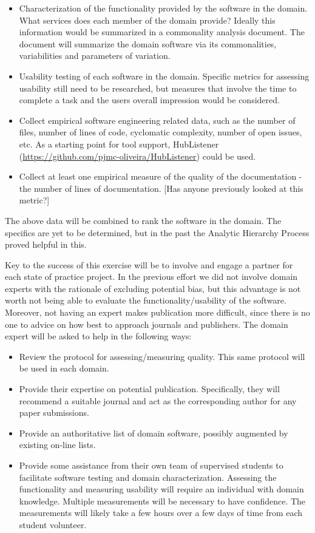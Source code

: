 \documentclass[12pt]{article}
\begin{document}
\begin{itemize}
\item Characterization of the functionality provided by the software in the
  domain.  What services does each member of the domain provide?  Ideally this
  information would be summarized in a commonality analysis document.  The
  document will summarize the domain software via its commonalities,
  variabilities and parameters of variation.
\item Usability testing of each software in the domain.  Specific metrics for
  assessing usability still need to be researched, but measures that involve the
  time to complete a task and the users overall impression would be considered.
\item Collect empirical software engineering related data, such as the number of
  files, number of lines of code, cyclomatic complexity, number of open issues,
  etc.  As a starting point for tool support, HubListener
  (\url{https://github.com/pjmc-oliveira/HubListener}) could be used.
\item Collect at least one empirical measure of the quality of the documentation
  - the number of lines of documentation.  [Has anyone previously looked at this
  metric?]
\end{itemize}

The above data will be combined to rank the software in the domain.  The
specifics are yet to be determined, but in the past the Analytic Hierarchy
Process proved helpful in this.

Key to the success of this exercise will be to involve and engage a partner for
each state of practice project.  In the previous effort we did not involve domain
experts with the rationale of excluding potential bias, but this advantage is
not worth not being able to evaluate the functionality/usability of the software.
Moreover, not having an expert makes publication more difficult, since there is
no one to advice on how best to approach journals and publishers.  The domain
expert will be asked to help in the following ways:

\begin{itemize}
\item Review the protocol for assessing/measuring quality.  This same protocol
  will be used in each domain.
\item Provide their expertise on potential publication.  Specifically, they will
  recommend a suitable journal and act as the corresponding author for any paper
  submissions. 
\item Provide an authoritative list of domain software, possibly augmented by
  existing on-line lists.
\item Provide some assistance from their own team of supervised students to
  facilitate software testing and domain characterization.  Assessing the
  functionality and measuring usability will require an individual with domain
  knowledge.  Multiple measurements will be necessary to have confidence.  The
  measurements will likely take a few hours over a few days of time from each
  student volunteer.
\end{itemize}
\end{document}
